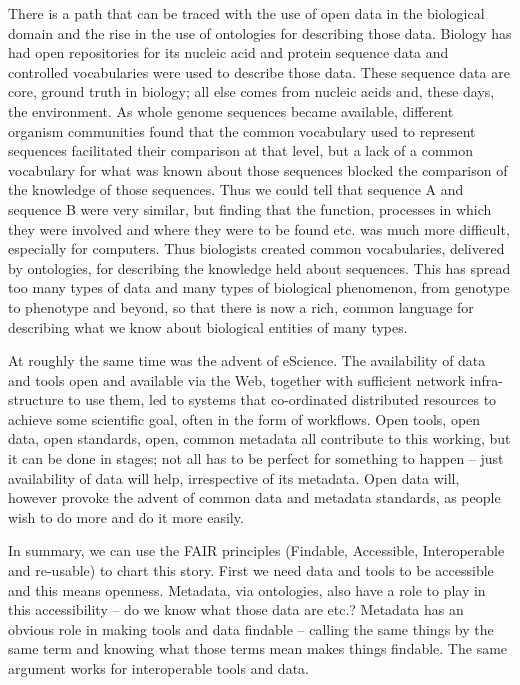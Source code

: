 \documentclass[a4paper,UKenglish]{dagrep}
\begin{document}
There is a path that can be traced with the use of open data in the biological
domain and the rise in the use of ontologies for describing those data. Biology
has had open repositories for its nucleic acid and protein sequence data and
controlled vocabularies were used to describe those data. These sequence data
are core, ground truth in biology; all else comes from nucleic acids and, these
days, the environment. As whole genome sequences became available, different
organism communities found that the common vocabulary used to represent
sequences facilitated their comparison at that level, but a lack of a common
vocabulary for what was known about those sequences blocked the comparison of
the knowledge of those sequences. Thus we could tell that sequence A and
sequence B were very similar, but finding that the function, processes in which
they were involved and where they were to be found etc. was much more difficult,
especially for computers. Thus biologists created common vocabularies, delivered
by ontologies, for describing the knowledge held about sequences. This has
spread too many types of data and many types of biological phenomenon, from
genotype to phenotype and beyond, so that there is now a rich, common language
for describing what we know about biological entities of many types.

At roughly the same time was the advent of eScience. The availability of data
and tools open and available via the Web, together with sufficient network
infra-structure to use them, led to systems that co-ordinated distributed
resources to achieve some scientific goal, often in the form of workflows.  Open
tools, open data, open standards, open, common metadata all contribute to this
working, but it can be done in  stages; not all has to be perfect for something
to happen – just availability of data will help, irrespective of its metadata.
Open data will, however provoke the advent of common data and metadata
standards, as people wish to do more and do it more easily.

In summary, we can use the FAIR principles (Findable, Accessible, Interoperable
and re-usable) to chart this story. First we need data and tools to be
accessible and this means openness. Metadata, via ontologies, also have a   role
to play in this accessibility – do we know what those data are etc.? Metadata
has an obvious role in making tools and data findable – calling the same things
by the same term and knowing what those terms mean makes things findable. The
same argument works for interoperable tools and data.
\end{document}
